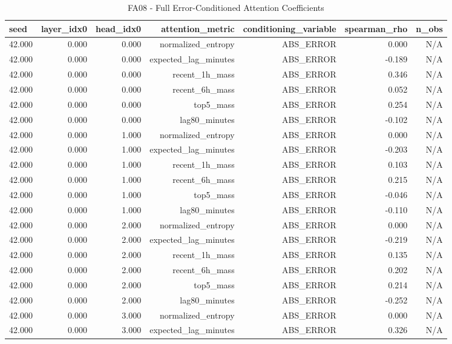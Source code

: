 \begin{table}[h!]
\centering
\caption{FA08 - Full Error-Conditioned Attention Coefficients}
\label{tab:fa08\_-\_full\_error-conditioned\_attention\_coefficients}
\begin{tabular}{lrrrrrr}
\toprule
seed & layer\_idx0 & head\_idx0 & attention\_metric & conditioning\_variable & spearman\_rho & n\_obs \\
\midrule
42.000 & 0.000 & 0.000 & normalized\_entropy & ABS\_ERROR & 0.000 & N/A \\
42.000 & 0.000 & 0.000 & expected\_lag\_minutes & ABS\_ERROR & -0.189 & N/A \\
42.000 & 0.000 & 0.000 & recent\_1h\_mass & ABS\_ERROR & 0.346 & N/A \\
42.000 & 0.000 & 0.000 & recent\_6h\_mass & ABS\_ERROR & 0.052 & N/A \\
42.000 & 0.000 & 0.000 & top5\_mass & ABS\_ERROR & 0.254 & N/A \\
42.000 & 0.000 & 0.000 & lag80\_minutes & ABS\_ERROR & -0.102 & N/A \\
42.000 & 0.000 & 1.000 & normalized\_entropy & ABS\_ERROR & 0.000 & N/A \\
42.000 & 0.000 & 1.000 & expected\_lag\_minutes & ABS\_ERROR & -0.203 & N/A \\
42.000 & 0.000 & 1.000 & recent\_1h\_mass & ABS\_ERROR & 0.103 & N/A \\
42.000 & 0.000 & 1.000 & recent\_6h\_mass & ABS\_ERROR & 0.215 & N/A \\
42.000 & 0.000 & 1.000 & top5\_mass & ABS\_ERROR & -0.046 & N/A \\
42.000 & 0.000 & 1.000 & lag80\_minutes & ABS\_ERROR & -0.110 & N/A \\
42.000 & 0.000 & 2.000 & normalized\_entropy & ABS\_ERROR & 0.000 & N/A \\
42.000 & 0.000 & 2.000 & expected\_lag\_minutes & ABS\_ERROR & -0.219 & N/A \\
42.000 & 0.000 & 2.000 & recent\_1h\_mass & ABS\_ERROR & 0.135 & N/A \\
42.000 & 0.000 & 2.000 & recent\_6h\_mass & ABS\_ERROR & 0.202 & N/A \\
42.000 & 0.000 & 2.000 & top5\_mass & ABS\_ERROR & 0.214 & N/A \\
42.000 & 0.000 & 2.000 & lag80\_minutes & ABS\_ERROR & -0.252 & N/A \\
42.000 & 0.000 & 3.000 & normalized\_entropy & ABS\_ERROR & 0.000 & N/A \\
42.000 & 0.000 & 3.000 & expected\_lag\_minutes & ABS\_ERROR & 0.326 & N/A \\

\end{tabular}
\end{table}
